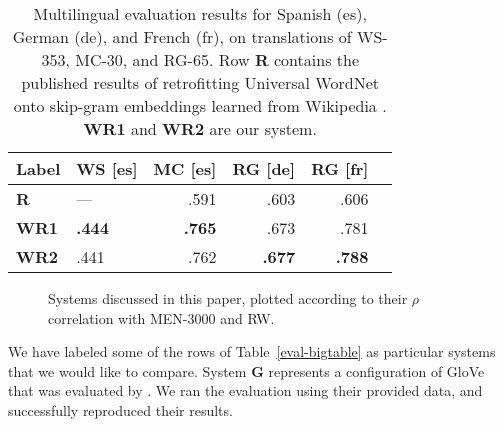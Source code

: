 \documentclass[11pt]{article}
\begin{document}
\begin{table}[t]
\centering
\begin{tabular}{llrrrr}
\toprule
Label   & WS [es] & MC [es] & RG [de] & RG [fr] \\
\midrule
\bf R   &         --- &       .591 &       .603 &       .606 \\
\bf WR1 &    \bf .444 &   \bf .765 &       .673 &       .781 \\
\bf WR2 &        .441 &       .762 &   \bf .677 &   \bf .788 \\
\bottomrule
\end{tabular}

\caption{
    Multilingual evaluation results for Spanish (es), German (de), and French
    (fr), on translations of WS-353, MC-30, and RG-65. Row {\bf R} contains the
    published results of retrofitting
    Universal WordNet onto skip-gram embeddings learned from Wikipedia
    \cite{faruqui2015retrofitting}. {\bf WR1} and {\bf WR2} are our system.
}
\label{eval-multilingual}
\end{table}

\begin{figure}
\caption{
    Systems discussed in this paper, plotted according to their $\rho$
    correlation with MEN-3000 and RW.
}
\label{compare-graph}
\end{figure}


We have labeled some of the rows of Table~\ref{eval-bigtable} as particular systems
that we would like to compare. System {\bf G} represents a configuration of
GloVe that was evaluated by . We ran the evaluation
using their provided data, and successfully reproduced their results.
\end{document}
